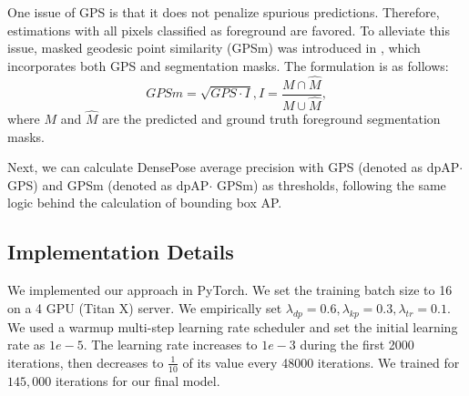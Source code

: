 \documentclass[sigconf, anonymous=false]{acmart}
\newcommand{\fer}[1]{\textcolor{blue}{[Fernando: #1]}}
\newcommand{\dong}[1]{\textcolor{green}{[Dong: #1]}}
\begin{document}
One issue of GPS is that it does not penalize spurious predictions. Therefore, estimations with all pixels classified as foreground are favored. To alleviate this issue, masked geodesic point similarity (GPSm) was introduced in \cite{DensePose}, which incorporates both GPS and segmentation masks. The formulation is as follows:
\begin{equation}
    GPSm = \sqrt{GPS\cdot I}, I = \frac{M \cap \hat{M}}{M \cup \hat{M}},
\end{equation}
where $M$ and $\hat{M}$ are the predicted and ground truth foreground segmentation masks. 

Next, we can calculate DensePose average precision with GPS (denoted as dpAP$\cdot$ GPS) and GPSm (denoted as dpAP$\cdot$ GPSm) as thresholds, following the same logic behind the calculation of bounding box AP. 




\subsection{Implementation Details}

We implemented our approach in PyTorch. We set the training batch size to 16 on a 4 GPU (Titan X) 
server. We empirically set $\lambda_{dp}=0.6, \lambda_{kp}=0.3, \lambda_{tr}=0.1$. We used a warmup multi-step learning rate scheduler and set the initial learning rate as $1e-5$. The learning rate increases to $1e-3$ during the first 2000 iterations, then decreases to $\frac{1}{10}$ of its value every 48000 iterations. We trained for $145,000$ iterations for our final model.

\end{document}
